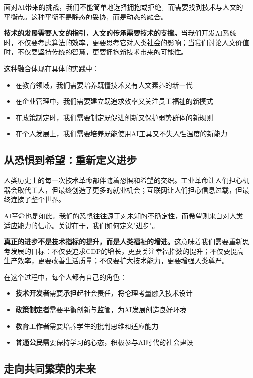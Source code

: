 面对AI带来的挑战，我们不能简单地选择拥抱或拒绝，而需要找到技术与人文的平衡点。这种平衡不是静态的妥协，而是动态的融合。

{\bf 技术的发展需要人文的指引，人文的传承需要技术的支撑。}当我们开发AI系统时，不仅要考虑算法的效率，更要思考它对人类社会的影响；当我们讨论人文价值时，不仅要坚持传统的智慧，更要拥抱新技术带来的可能性。

这种融合体现在具体的实践中：
\begin{itemize}
\item 在教育领域，我们需要培养既懂技术又有人文素养的新一代
\item 在企业管理中，我们需要建立既追求效率又关注员工福祉的新模式
\item 在政策制定时，我们需要制定既促进创新又保护弱势群体的新规则
\item 在个人发展上，我们需要培养既能使用AI工具又不失人性温度的新能力
\end{itemize}

\subsection*{从恐惧到希望：重新定义进步}

人类历史上的每一次技术革命都伴随着恐惧和希望的交织。工业革命让人们担心机器会取代工人，但最终创造了更多的就业机会；互联网让人们担心信息过载，但最终连接了整个世界。

AI革命也是如此。我们的恐惧往往源于对未知的不确定性，而希望则来自对人类适应能力的信心。关键在于，我们如何定义"进步"。

{\bf 真正的进步不是技术指标的提升，而是人类福祉的增进。}这意味着我们需要重新思考发展的目标：不仅要追求GDP的增长，更要关注幸福指数的提升；不仅要提高生产效率，更要改善生活质量；不仅要扩大技术能力，更要增强人类尊严。

在这个过程中，每个人都有自己的角色：
\begin{itemize}
\item {\bf 技术开发者}需要承担起社会责任，将伦理考量融入技术设计
\item {\bf 政策制定者}需要平衡创新与监管，为AI发展创造良好环境
\item {\bf 教育工作者}需要培养学生的批判思维和适应能力
\item {\bf 普通公民}需要保持学习的心态，积极参与AI时代的社会建设
\end{itemize}

\subsection*{走向共同繁荣的未来}

